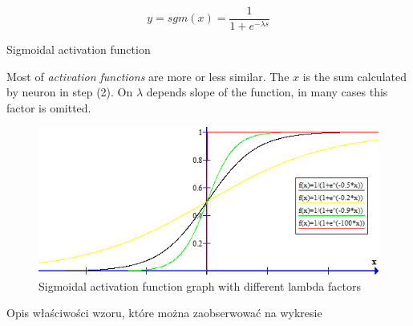 \begin{mycapequ}[!ht]
    $$y = sgm(x) = \frac{1}{1+e^{-\lambda s}}$$
    \caption{Sigmoidal activation function}
    \label{formula:SigmoidalActivationFunction}
\end{mycapequ}

Most of \textit{activation functions} are more or less similar. The $x$ is the sum calculated by neuron in step (2). On $\lambda$ depends slope of the function, in many cases this factor is omitted. 

\newpage

\begin{figure}[!h]
    \centering
    \includegraphics[scale=1]{Media/sgm_graph.png}
    \caption[Sigmoidal activation function graph]{Sigmoidal activation function graph with different lambda factors}
    \label{fig:SigmoidalFunctionGraph}
\end{figure}

Opis właściwości wzoru, które można zaobserwować na wykresie
